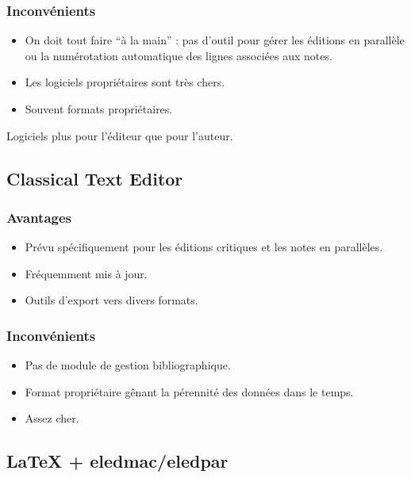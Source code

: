 \documentclass{article}
\begin{document}
\subsubsection{Inconvénients}
\begin{itemize}
	\item On doit tout faire \enquote{à la main} : pas d'outil pour gérer les éditions en parallèle ou la numérotation automatique des lignes associées aux notes.
	\item Les logiciels propriétaires sont très chers.
	\item Souvent formats propriétaires.
\end{itemize}

Logiciels plus pour l'éditeur que pour l'auteur.

\subsection{Classical Text Editor}
\subsubsection{Avantages}
\begin{itemize}
	\item Prévu spécifiquement pour les éditions critiques et les notes en parallèles.
	\item Fréquemment mis à jour.
	\item Outils d'export vers divers formats.
\end{itemize}

\subsubsection{Inconvénients}
\begin{itemize}
	\item Pas de module de gestion bibliographique.
	\item Format propriétaire gênant la pérennité des données dans le temps.
	\item Assez cher.
\end{itemize}

\subsection{\LaTeX{} + eledmac/eledpar}
\end{document}
